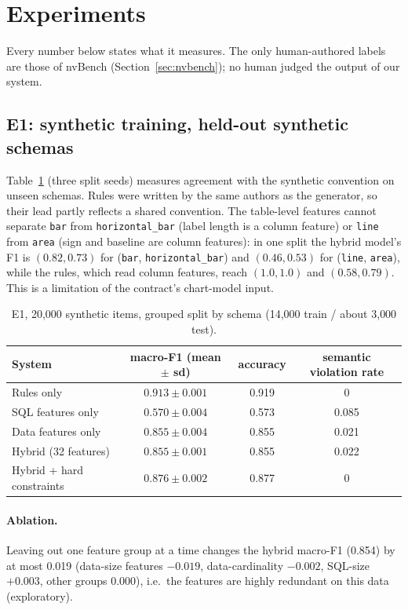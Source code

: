\documentclass[11pt]{article}
\newcommand{\sql}[1]{\texttt{#1}}
\begin{document}
\section{Experiments}
Every number below states what it measures. The only human-authored labels are those of nvBench (Section~\ref{sec:nvbench}); no human judged the output of our system.
\subsection{E1: synthetic training, held-out synthetic schemas}
Table~\ref{tab:e1} (three split seeds) measures agreement with the synthetic convention on unseen schemas. Rules were written by the same authors as the generator, so their lead partly reflects a shared convention. The table-level features cannot separate \sql{bar} from \sql{horizontal\_bar} (label length is a column feature) or \sql{line} from \sql{area} (sign and baseline are column features): in one split the hybrid model's F1 is $(0.82, 0.73)$ for (\sql{bar}, \sql{horizontal\_bar}) and $(0.46, 0.53)$ for (\sql{line}, \sql{area}), while the rules, which read column features, reach $(1.0, 1.0)$ and $(0.58, 0.79)$. This is a limitation of the contract's chart-model input.
\begin{table}[h]\centering\small
\begin{tabular}{lccc}\toprule
System & macro-F1 (mean $\pm$ sd) & accuracy & semantic violation rate\\\midrule
Rules only & $0.913\pm0.001$ & 0.919 & 0\\
SQL features only & $0.570\pm0.004$ & 0.573 & 0.085\\
Data features only & $0.855\pm0.004$ & 0.855 & 0.021\\
Hybrid (32 features) & $0.855\pm0.001$ & 0.855 & 0.022\\
Hybrid + hard constraints & $0.876\pm0.002$ & 0.877 & 0\\\bottomrule
\end{tabular}
\caption{E1, 20{,}000 synthetic items, grouped split by schema (14{,}000 train / about 3{,}000 test).}\label{tab:e1}
\end{table}
\paragraph{Ablation.} Leaving out one feature group at a time changes the hybrid macro-F1 (0.854) by at most 0.019 (data-size features $-0.019$, data-cardinality $-0.002$, SQL-size $+0.003$, other groups 0.000), i.e.\ the features are highly redundant on this data (exploratory).
\end{document}
